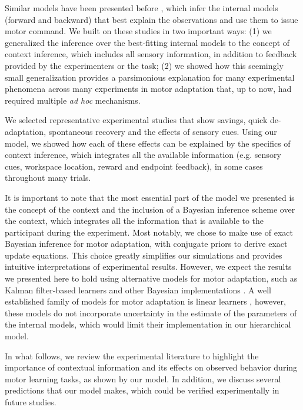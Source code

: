\documentclass[a4paper,doc,floatsintext,natbib]{apa6}
\begin{document}
Similar models have been presented before \cite[e.g.][]{Wolpert_Multiple_1998,Baddeley_System_2003,Imamizu_Explicit_2007}, which infer the internal models (forward and backward) that best explain the observations and use them to issue motor command. We built on these studies in two important ways: (1) we generalized the inference over the best-fitting internal models to the concept of context inference, which includes all sensory information, in addition to feedback provided by the experimenters or the task; (2) we showed how this seemingly small generalization provides a parsimonious explanation for many experimental phenomena across many experiments in motor adaptation that, up to now, had required multiple \textit{ad hoc} mechanisms.

We selected representative experimental studies that show savings, quick de-adaptation, spontaneous recovery and the effects of sensory cues. Using our model, we showed how each of these effects can be explained by the specifics of context inference, which integrates all the available information (e.g. sensory cues, workspace location, reward and endpoint feedback), in some cases throughout many trials.

It is important to note that the most essential part of the model we presented is the concept of the context and the inclusion of a Bayesian inference scheme over the context, which integrates all the information that is available to the participant during the experiment. Most notably, we chose to make use of exact Bayesian inference for motor adaptation, with conjugate priors to derive exact update equations. This choice greatly simplifies our simulations and provides intuitive interpretations of experimental results. However, we expect the results we presented here to hold using alternative models for motor adaptation, such as Kalman filter-based learners \cite[e.g.][]{Oh_Minimizing_2019,Baddeley_System_2003} and other Bayesian implementations \cite[e.g.][]{Wolpert_Multiple_1998,Kording_Bayesian_2004}. A well established family of models for motor adaptation is linear learners \cite[e.g.][]{Smith_Interacting_2006,Forano_Timescales_2020,Lee_Dual_2009}, however, these models do not incorporate uncertainty in the estimate of the parameters of the internal models, which would limit their implementation in our hierarchical model.

In what follows, we review the experimental literature to highlight the importance of contextual information and its effects on observed behavior during motor learning tasks, as shown by our model. In addition, we discuss several predictions that our model makes, which could be verified experimentally in future studies.
\end{document}
